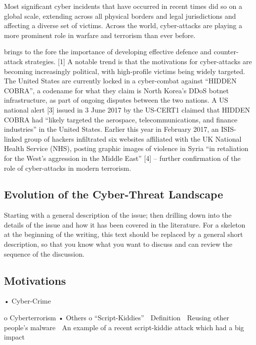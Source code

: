 Most significant cyber incidents that have occurred in recent times did so on a global scale, extending across all physical borders and legal jurisdictions and affecting a diverse set of victims. Across the world, cyber-attacks are playing a more prominent role in warfare and terrorism than ever before.

brings to the fore the importance of developing effective defence and counter-attack strategies. [1]  A notable trend is that the motivations for cyber-attacks are becoming increasingly political, with high-profile victims being widely targeted. The United States are currently locked in a cyber-combat against “HIDDEN COBRA”, a codename for what they claim is North Korea’s DDoS botnet infrastructure, as part of ongoing disputes between the two nations. A US national alert [3] issued in  3 June 2017 by the US-CERT1 claimed that HIDDEN COBRA had “likely targeted the aerospace, telecommunications, and finance industries” in the United States. Earlier this year in February 2017, an ISIS-linked group of hackers infiltrated six websites affiliated with the UK National Health Service (NHS), posting graphic images of violence in Syria “in retaliation for the West’s aggression in the Middle East” [4] – further confirmation of the role of cyber-attacks in modern terrorism. 


	\subsection{Evolution of the Cyber-Threat Landscape}
	
	Starting with a general description of the issue; then drilling down into the details of the issue and how it has been covered in the literature. For a skeleton at the beginning of the writing, this text should be replaced by a general short description, so that you know what you want to discuss and can review the sequence of the discussion.
	
	\subsection{Motivations}
	
	•	Cyber-Crime
	
	o	Cyberterrorism
	•	Others
	o	“Script-Kiddies”
		Definition
		Reusing other people’s malware
		An example of a recent script-kiddie attack which had a big impact



